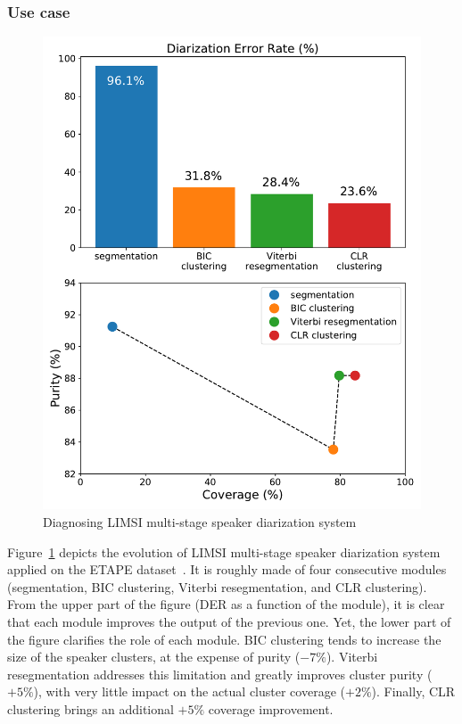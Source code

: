 \documentclass[a4paper]{article}
\begin{document}
\subsubsection{Use case}

\begin{figure}[htb]
  \centering
  \includegraphics[width=0.8\linewidth]{figures/diagnostic.pdf}
  \caption{Diagnosing LIMSI multi-stage speaker diarization system~\cite{Barras2006}}
  \label{fig:diagnostic}
\end{figure}

Figure~\ref{fig:diagnostic} depicts the evolution of LIMSI multi-stage speaker diarization system~\cite{Barras2006} applied on the ETAPE dataset~\cite{Gravier2012}.
It is roughly made of four consecutive modules (segmentation, BIC clustering, Viterbi resegmentation, and CLR clustering).
From the upper part of the figure (DER as a function of the module), it is clear that each module improves the output of the previous one.
Yet, the lower part of the figure clarifies the role of each module.
BIC clustering tends to increase the size of the speaker clusters, at the expense of purity ($-7\%$).
Viterbi resegmentation addresses this limitation and greatly improves cluster purity ($+5\%$), with very little impact on the actual cluster coverage ($+2\%$).
Finally, CLR clustering brings an additional $+5\%$ coverage improvement.
\end{document}

